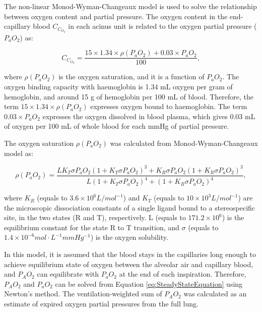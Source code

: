 The non-linear Monod-Wyman-Changeaux model \citep{monod1965nature} is used to solve the relationship between oxygen content and partial pressure. The oxygen content in the end-capillary blood $C_{C_{O_2}}$ in each acinus unit is related to the oxygen partial pressure ($P_aO_2$) as:

\begin{equation} 
 \label{eq:OxygenContent}
 C_{C_{O_2}} = \frac{15 \times 1.34 \times \rho(P_aO_2) + 0.03 \times P_aO_2}{100},
\end{equation}

\noindent where $\rho(P_aO_2)$ is the oxygen saturation, and it is a function of $P_aO_2$. The oxygen binding capacity with haemoglobin is 1.34 mL oxygen per gram of hemoglobin, and around 15 g of hemoglobin per 100 mL of blood. Therefore, the term $15 \times 1.34 \times \rho(P_aO_2)$ expresses oxygen bound to haemoglobin. The term $0.03 \times P_aO_2$ expresses the oxygen dissolved in blood plasma, which gives 0.03 mL of oxygen per 100 mL of whole blood for each mmHg of partial pressure.

The oxygen saturation $\rho(P_aO_2)$ was calculated from Monod-Wyman-Changeaux model \citep{monod1965nature} as:

\begin{equation} 
 \label{eq:OxygenSaturation}
 \rho(P_aO_2) = \frac{LK_T \sigma P_aO_2 (1+K_T\sigma P_aO_2)^3 + K_R\sigma P_aO_2(1+K_R\sigma P_aO_2)^3}{L(1+K_T \sigma P_aO_2)^4 + (1+K_R \sigma P_aO_2)^4},
\end{equation}

\noindent where $K_R$ (equals to $3.6 \times 10^6 L/mol^{-1}$) and  $K_T$ (equals to $10 \times 10^3 L/mol^{-1}$) are the microscopic dissociation constants of a single ligand bound to a stereospecific site, in the two states (R and T), respectively. L (equals to $171.2 \times 10^6$) is the equilibrium constant for the state R to T transition, and $\sigma$ (equals to $1.4 \times 10^{-6} mol \cdot L^{-1}mm Hg^{-1}$) is the oxygen solubility.

In this model, it is assumed that the blood stays in the capillaries long enough to achieve equilibrium state of oxygen between the alveolar air and capillary blood, and $P_AO_2$ can equilibrate with $P_aO_2$ at the end of each inspiration. Therefore, $P_AO_2$ and $P_aO_2$ can be solved from Equation \ref{eq:SteadyStateEquation} using Newton’s method. The ventilation-weighted sum of $P_AO_2$ was calculated as an estimate of expired oxygen partial pressures from the full lung.

